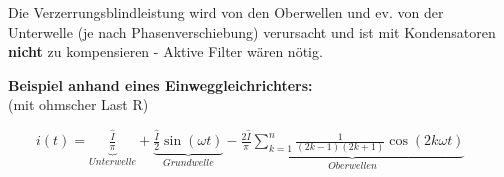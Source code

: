      	Die Verzerrungsblindleistung wird von den Oberwellen und ev. von der Unterwelle (je
     	nach Phasenverschiebung) verursacht und ist mit Kondensatoren \textbf{nicht} zu kompensieren -
     	Aktive Filter w\"aren n\"otig.
		\\		
		
	\begin{minipage}[c]{8cm} 
	   \textbf{Beispiel anhand eines Einweggleichrichters:}	  	\\
	   (mit ohmscher Last R) 
	\end{minipage}   
	\begin{minipage}[c]{10cm} 	
	   $ \qquad i(t) = \underbrace{\frac{\hat{I}}{\pi}}_{Unterwelle} + \underbrace{\frac{\hat{I}}{2}
	   \sin(\omega t)}_{Grundwelle} - \underbrace{\frac{2\hat{I}}{\pi} \sum\limits_{k=1}^n \frac{1}{(2k-1)(2k+1)} \cos(2k\omega t)}_{Oberwellen} $
	\end{minipage}   
		
